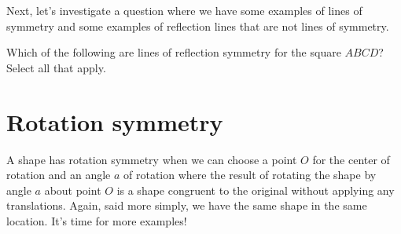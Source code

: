 \documentclass{ximera}
\begin{document}
Next, let's investigate a question where we have some examples of lines of symmetry and some examples of reflection lines that are not lines of symmetry.

\begin{question}
Which of the following are lines of reflection symmetry for the square $ABCD$? Select all that apply.
\begin{image}
\end{image}
\end{question}

\begin{selectAll}
\end{selectAll}


\section{Rotation symmetry}


A shape has rotation symmetry when we can choose a point $O$ for the center of rotation and an angle $a$ of rotation where the result of rotating the shape by angle $a$ about point $O$ is a shape congruent to the original without applying any translations. Again, said more simply, we have the same shape in the same location. It's time for more examples!
\end{document}
